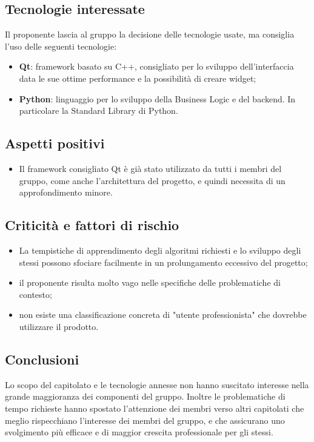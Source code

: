 \subsection{Tecnologie interessate}
Il proponente lascia al gruppo la decisione delle tecnologie usate, ma consiglia l'uso delle seguenti tecnologie:
\begin{itemize}
    \item \textbf{Qt}: framework basato su C++, consigliato per lo sviluppo dell'interfaccia data le sue ottime performance e la possibilità di creare widget;
    \item \textbf{Python}: linguaggio per lo sviluppo della Business Logic e del backend. In particolare la Standard Library di Python.
\end{itemize}
\subsection{Aspetti positivi}
\begin{itemize}
    \item Il framework consigliato Qt è già stato utilizzato da tutti i membri del gruppo, come anche l'architettura del progetto, e quindi necessita di un approfondimento minore.
\end{itemize}
\subsection{Criticità e fattori di rischio}
\begin{itemize}
    \item La tempistiche di apprendimento degli algoritmi richiesti e lo sviluppo degli stessi possono sfociare facilmente in un prolungamento eccessivo del progetto;
    \item il proponente risulta molto vago nelle specifiche delle problematiche di contesto;
    \item non esiste una classificazione concreta di "utente professionista" che dovrebbe utilizzare il prodotto.
\end{itemize}
\subsection{Conclusioni}
Lo scopo del capitolato e le tecnologie annesse non hanno suscitato interesse nella grande maggioranza dei componenti del gruppo. Inoltre le problematiche di tempo richieste hanno spostato l'attenzione dei membri verso altri capitolati che meglio rispecchiano l'interesse dei membri del gruppo, e che assicurano uno svolgimento più efficace e di maggior crescita professionale per gli stessi.